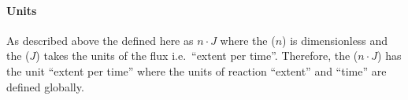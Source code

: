 \paragraph{Units}
As described above the \FluxObjective defined here as $n\cdot J$ where the  ($n$) is dimensionless and the  ($J$) takes the units of the  flux i.e.~``extent per time''. Therefore, the \FluxObjective ($n\cdot J$)  has the unit ``extent per time'' where the units of reaction ``extent'' and ``time'' are defined globally.


